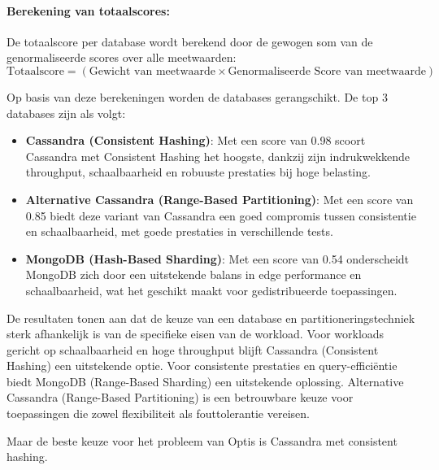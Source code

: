 \paragraph{Berekening van totaalscores:} 
De totaalscore per database wordt berekend door de gewogen som van de genormaliseerde scores over alle meetwaarden:
\[
\text{Totaalscore} = (\text{Gewicht van meetwaarde} \times \text{Genormaliseerde Score van meetwaarde})
\]

Op basis van deze berekeningen worden de databases gerangschikt. De top 3 databases zijn als volgt:

\begin{itemize}
    \item \textbf{Cassandra (Consistent Hashing)}: Met een score van 0.98 scoort Cassandra met Consistent Hashing het hoogste, dankzij zijn indrukwekkende throughput, schaalbaarheid en robuuste prestaties bij hoge belasting.
    \item \textbf{Alternative Cassandra (Range-Based Partitioning)}: Met een score van 0.85 biedt deze variant van Cassandra een goed compromis tussen consistentie en schaalbaarheid, met goede prestaties in verschillende tests.
    \item \textbf{MongoDB (Hash-Based Sharding)}: Met een score van 0.54 onderscheidt MongoDB zich door een uitstekende balans in edge performance en schaalbaarheid, wat het geschikt maakt voor gedistribueerde toepassingen.
\end{itemize}

De resultaten tonen aan dat de keuze van een database en partitioneringstechniek sterk afhankelijk is van de specifieke eisen van de workload.
Voor workloads gericht op schaalbaarheid en hoge throughput blijft Cassandra (Consistent Hashing) een uitstekende optie. Voor consistente prestaties en query-efficiëntie biedt MongoDB (Range-Based Sharding) een uitstekende oplossing.
Alternative Cassandra (Range-Based Partitioning) is een betrouwbare keuze voor toepassingen die zowel flexibiliteit als fouttolerantie vereisen.

Maar de beste keuze voor het probleem van Optis is Cassandra met consistent hashing.